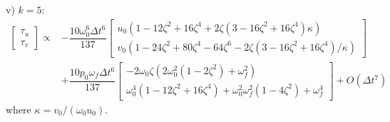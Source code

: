 \documentclass[review]{elsarticle}
\begin{document}
\begin{appendices}
v) $k=5$:
\begin{equation}
    \begin{array}{ll}
    \begin{bmatrix}
        \tau_{u} \\ \tau_{v}
    \end{bmatrix} \propto &
    -\dfrac{10\omega_0^6\Delta t^6}{137}
    \begin{bmatrix}
        u_0 (1-12\zeta^2+16\zeta^4+2\zeta(3-16\zeta^2+16\zeta^4)\kappa) \\
        v_0 (1-24\zeta^2+80\zeta^4-64\zeta^6-2\zeta(3-16\zeta^2+16\zeta^4)/\kappa)
    \end{bmatrix} \\
    &+\dfrac{10 p_0 \omega_f \Delta t^6}{137}
    \begin{bmatrix}
        -2\omega_0 \zeta (2\omega_0^2 (1-2\zeta^2)+\omega_f^2) \\
         \omega_0^4 (1 - 12\zeta^2 + 16\zeta^4) + \omega_0^2\omega_f^2 ( 1 - 4\zeta^2) + \omega_f^4
    \end{bmatrix} + O(\Delta t^7)
    \end{array}
\end{equation}
where $\kappa = v_0/(\omega_0 u_0)$.


\end{appendices}


\end{document}
